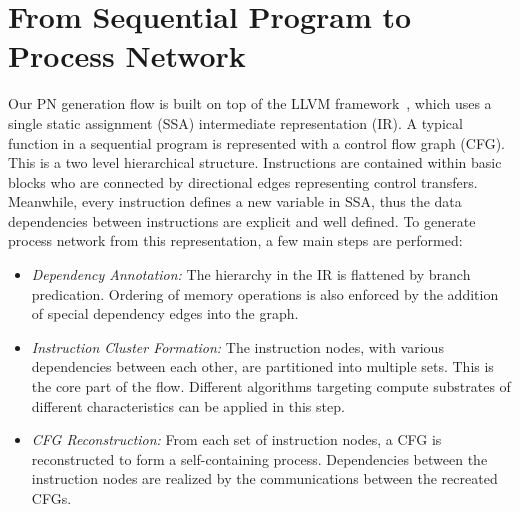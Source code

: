 \documentclass{sig-alternate}
\begin{document}
\section{From Sequential Program to Process Network}
\label{mainConvert}
Our PN generation flow is built on top of the LLVM framework~\cite{Lattner:2004:LCF:977395.977673}, which uses a single static assignment (SSA) intermediate representation (IR). 
A typical function in a sequential program is represented with
a control flow graph (CFG). This is a two level hierarchical structure. Instructions are contained within basic blocks who are connected by directional edges representing control transfers. 
Meanwhile, every instruction defines a new variable in SSA, thus the data dependencies between instructions are explicit and well defined.  
To generate process
network from this representation, a few main steps are performed:
\begin{itemize}

\item \textit{Dependency Annotation:} The hierarchy in the IR is flattened by branch predication. Ordering of memory operations is also enforced by the addition of
special dependency edges into the graph.

\item \textit{Instruction Cluster Formation:} The instruction nodes, with various dependencies between
each other, are partitioned into multiple sets. This is the core part of the flow. Different algorithms targeting compute substrates of different characteristics can be applied in this step. 

\item \textit{CFG Reconstruction:} From each set of instruction nodes, a CFG is reconstructed
to form a self-containing process. Dependencies between the instruction
nodes are realized by the communications between the recreated CFGs. 

\end{itemize}
\end{document}

